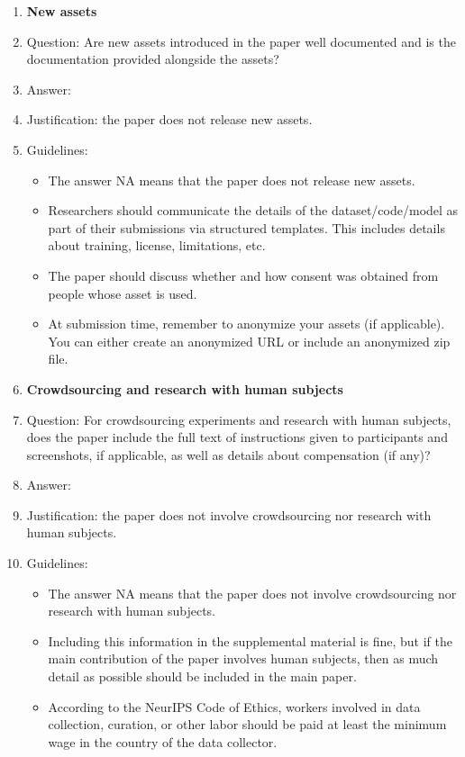 \documentclass{article}
\begin{document}
\begin{enumerate}
\item {\bf New assets}
    \item[] Question: Are new assets introduced in the paper well documented and is the documentation provided alongside the assets?
    \item[] Answer: \answerNA{} %
    \item[] Justification: the paper does not release new assets.
    \item[] Guidelines:
    \begin{itemize}
        \item The answer NA means that the paper does not release new assets.
        \item Researchers should communicate the details of the dataset/code/model as part of their submissions via structured templates. This includes details about training, license, limitations, etc. 
        \item The paper should discuss whether and how consent was obtained from people whose asset is used.
        \item At submission time, remember to anonymize your assets (if applicable). You can either create an anonymized URL or include an anonymized zip file.
    \end{itemize}

\item {\bf Crowdsourcing and research with human subjects}
    \item[] Question: For crowdsourcing experiments and research with human subjects, does the paper include the full text of instructions given to participants and screenshots, if applicable, as well as details about compensation (if any)? 
    \item[] Answer: \answerNA{} %
    \item[] Justification: the paper does not involve crowdsourcing nor research with human subjects.
    \item[] Guidelines:
    \begin{itemize}
        \item The answer NA means that the paper does not involve crowdsourcing nor research with human subjects.
        \item Including this information in the supplemental material is fine, but if the main contribution of the paper involves human subjects, then as much detail as possible should be included in the main paper. 
        \item According to the NeurIPS Code of Ethics, workers involved in data collection, curation, or other labor should be paid at least the minimum wage in the country of the data collector. 
    \end{itemize}


\end{enumerate}
\end{document}

